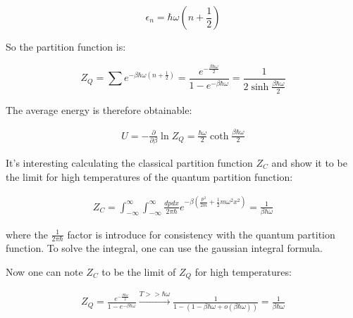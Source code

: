 \documentclass{article}
\begin{document}
\begin{equation}
    \epsilon_n=\hbar\omega\left(n+\frac{1}{2}\right)
\end{equation}

So the partition function is:

\begin{equation}
    Z_Q=\sum e^{-\beta\hbar\omega\left(n+\frac{1}{2}\right)}=\frac{e^{-\frac{\beta\hbar\omega}{2}}}{1-e^{-\beta\hbar\omega}}=\frac{1}{2\sinh{\frac{\beta\hbar\omega}{2}}}
\end{equation}

The average energy is therefore obtainable:

\begin{align*}
    U=-\frac{\partial}{\partial \beta}\ln{Z_Q}=\frac{\hbar \omega}{2}\coth{\frac{\beta\hbar\omega}{2}}
\end{align*}

It's interesting calculating the classical partition function $Z_C$ and show
it to be the limit for high temperatures of the quantum partition function:

\begin{align*}
    Z_C=\int_{-\infty}^\infty\int_{-\infty}^\infty \frac{dp dx}{2\pi \hbar} e^{-\beta\left(\frac{p^2}{2m}+\frac{1}{2}m\omega^2x^2\right)}=\frac{1}{\beta\hbar\omega}
\end{align*}

where the $\frac{1}{2\pi\hbar}$ factor is introduce for consistency with the quantum partition function.
To solve the integral, one can use the gaussian integral formula.

Now one can note $Z_C$ to be the limit of $Z_Q$ for high temperatures:

\begin{align*}
    Z_Q=\frac{e^{-\frac{\beta \hbar \omega}{2}}}{1-e^{-\beta\hbar\omega}}\xrightarrow{{T>>\hbar\omega}}\frac{1}{1-(1-\beta\hbar\omega+ o(\beta\hbar\omega))}=\frac{1}{\beta\hbar\omega}
\end{align*}



\newpage
\end{document}
